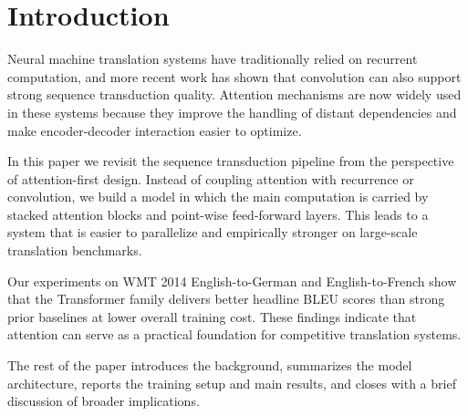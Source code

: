 \section{Introduction}

Neural machine translation systems have traditionally relied on recurrent computation, and more recent work has shown that convolution can also support strong sequence transduction quality. Attention mechanisms are now widely used in these systems because they improve the handling of distant dependencies and make encoder-decoder interaction easier to optimize.

In this paper we revisit the sequence transduction pipeline from the perspective of attention-first design. Instead of coupling attention with recurrence or convolution, we build a model in which the main computation is carried by stacked attention blocks and point-wise feed-forward layers. This leads to a system that is easier to parallelize and empirically stronger on large-scale translation benchmarks.

Our experiments on WMT 2014 English-to-German and English-to-French show that the Transformer family delivers better headline BLEU scores than strong prior baselines at lower overall training cost. These findings indicate that attention can serve as a practical foundation for competitive translation systems.

The rest of the paper introduces the background, summarizes the model architecture, reports the training setup and main results, and closes with a brief discussion of broader implications.

